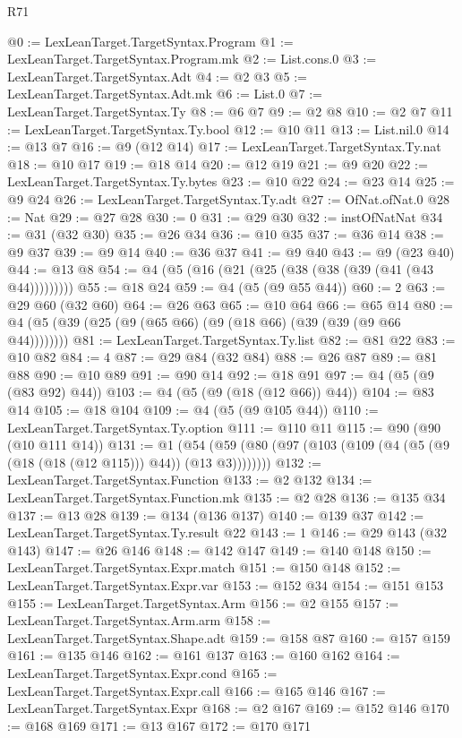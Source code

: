 \begin{lexlean}{R71}
\begin{coremodule}
@0 := LexLeanTarget.TargetSyntax.Program
@1 := LexLeanTarget.TargetSyntax.Program.mk
@2 := List.cons.{0}
@3 := LexLeanTarget.TargetSyntax.Adt
@4 := @2 @3
@5 := LexLeanTarget.TargetSyntax.Adt.mk
@6 := List.{0}
@7 := LexLeanTarget.TargetSyntax.Ty
@8 := @6 @7
@9 := @2 @8
@10 := @2 @7
@11 := LexLeanTarget.TargetSyntax.Ty.bool
@12 := @10 @11
@13 := List.nil.{0}
@14 := @13 @7
@16 := @9 (@12 @14)
@17 := LexLeanTarget.TargetSyntax.Ty.nat
@18 := @10 @17
@19 := @18 @14
@20 := @12 @19
@21 := @9 @20
@22 := LexLeanTarget.TargetSyntax.Ty.bytes
@23 := @10 @22
@24 := @23 @14
@25 := @9 @24
@26 := LexLeanTarget.TargetSyntax.Ty.adt
@27 := OfNat.ofNat.{0}
@28 := Nat
@29 := @27 @28
@30 := 0
@31 := @29 @30
@32 := instOfNatNat
@34 := @31 (@32 @30)
@35 := @26 @34
@36 := @10 @35
@37 := @36 @14
@38 := @9 @37
@39 := @9 @14
@40 := @36 @37
@41 := @9 @40
@43 := @9 (@23 @40)
@44 := @13 @8
@54 := @4 (@5 (@16 (@21 (@25 (@38 (@38 (@39 (@41 (@43 @44)))))))))
@55 := @18 @24
@59 := @4 (@5 (@9 @55 @44))
@60 := 2
@63 := @29 @60 (@32 @60)
@64 := @26 @63
@65 := @10 @64
@66 := @65 @14
@80 := @4 (@5 (@39 (@25 (@9 (@65 @66) (@9 (@18 @66) (@39 (@39 (@9 @66 @44))))))))
@81 := LexLeanTarget.TargetSyntax.Ty.list
@82 := @81 @22
@83 := @10 @82
@84 := 4
@87 := @29 @84 (@32 @84)
@88 := @26 @87
@89 := @81 @88
@90 := @10 @89
@91 := @90 @14
@92 := @18 @91
@97 := @4 (@5 (@9 (@83 @92) @44))
@103 := @4 (@5 (@9 (@18 (@12 @66)) @44))
@104 := @83 @14
@105 := @18 @104
@109 := @4 (@5 (@9 @105 @44))
@110 := LexLeanTarget.TargetSyntax.Ty.option
@111 := @110 @11
@115 := @90 (@90 (@10 @111 @14))
@131 := @1 (@54 (@59 (@80 (@97 (@103 (@109 (@4 (@5 (@9 (@18 (@18 (@12 @115))) @44)) (@13 @3))))))))
@132 := LexLeanTarget.TargetSyntax.Function
@133 := @2 @132
@134 := LexLeanTarget.TargetSyntax.Function.mk
@135 := @2 @28
@136 := @135 @34
@137 := @13 @28
@139 := @134 (@136 @137)
@140 := @139 @37
@142 := LexLeanTarget.TargetSyntax.Ty.result @22
@143 := 1
@146 := @29 @143 (@32 @143)
@147 := @26 @146
@148 := @142 @147
@149 := @140 @148
@150 := LexLeanTarget.TargetSyntax.Expr.match
@151 := @150 @148
@152 := LexLeanTarget.TargetSyntax.Expr.var
@153 := @152 @34
@154 := @151 @153
@155 := LexLeanTarget.TargetSyntax.Arm
@156 := @2 @155
@157 := LexLeanTarget.TargetSyntax.Arm.arm
@158 := LexLeanTarget.TargetSyntax.Shape.adt
@159 := @158 @87
@160 := @157 @159
@161 := @135 @146
@162 := @161 @137
@163 := @160 @162
@164 := LexLeanTarget.TargetSyntax.Expr.cond
@165 := LexLeanTarget.TargetSyntax.Expr.call
@166 := @165 @146
@167 := LexLeanTarget.TargetSyntax.Expr
@168 := @2 @167
@169 := @152 @146
@170 := @168 @169
@171 := @13 @167
@172 := @170 @171

\end{coremodule}
\end{lexlean}
